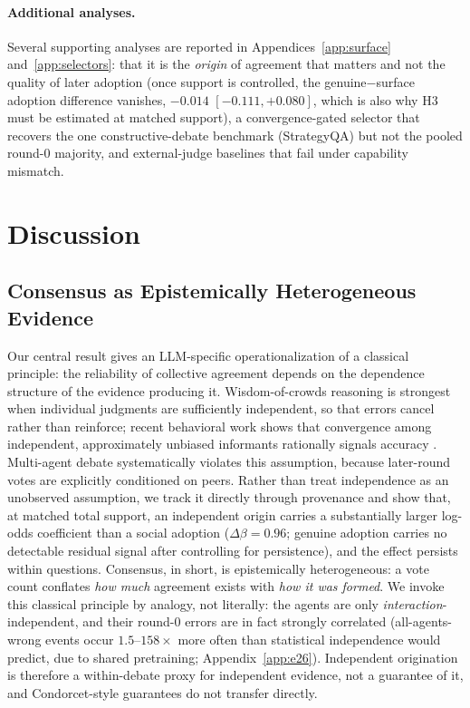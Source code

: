 \paragraph{Additional analyses.}
\label{par:genuine_surface}
Several supporting analyses are reported in Appendices~\ref{app:surface} and~\ref{app:selectors}: that it is
the \emph{origin} of agreement that matters and not the quality of later adoption (once support is
controlled, the genuine$-$surface adoption difference vanishes, $-0.014$ $[-0.111,+0.080]$, which is also why
H3 must be estimated at matched support), a convergence-gated selector that recovers the one
constructive-debate benchmark (StrategyQA) but not the pooled round-$0$ majority, and external-judge
baselines that fail under capability mismatch.


\section{Discussion}
\label{sec:discussion}

\subsection{Consensus as Epistemically Heterogeneous Evidence}
\label{subsec:epistemic_heterogeneity}
Our central result gives an LLM-specific operationalization of a classical principle: the reliability of
collective agreement depends on the dependence structure of the evidence producing it. Wisdom-of-crowds
reasoning is strongest when individual judgments are sufficiently independent, so that errors cancel rather
than reinforce; recent behavioral work shows that convergence among independent, approximately unbiased
informants rationally signals accuracy \cite{pfander2025crowd}. Multi-agent debate systematically violates
this assumption, because later-round votes are explicitly conditioned on peers. Rather than treat
independence as an unobserved assumption, we track it directly through provenance and show that, at matched
total support, an independent origin carries a substantially larger log-odds coefficient than a social
adoption ($\Delta\beta=0.96$; genuine adoption carries no detectable residual signal after controlling for
persistence), and the effect
persists within questions. Consensus, in short, is
epistemically heterogeneous: a vote count conflates \emph{how much} agreement exists with \emph{how it was
formed}. We invoke this classical principle by analogy, not literally: the agents are only
\emph{interaction}-independent, and their round-$0$ errors are in fact strongly correlated (all-agents-wrong
events occur $1.5$--$158\times$ more often than statistical independence would predict, due to shared
pretraining; Appendix~\ref{app:e26}). Independent origination is therefore a within-debate proxy for
independent evidence, not a guarantee of it, and Condorcet-style guarantees do not transfer directly.

